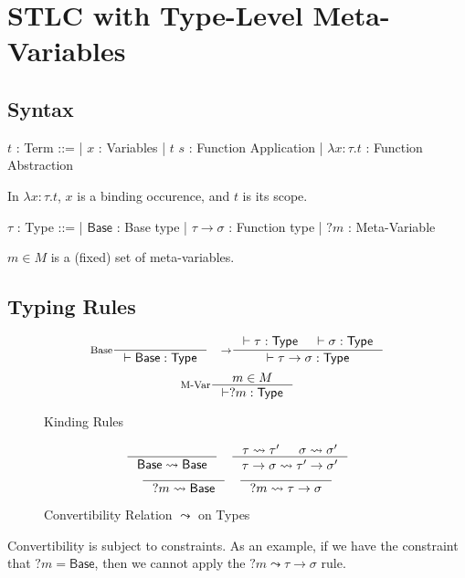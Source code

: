 \documentclass[a4paper]{report}
\newcommand{\Base}[0]{\mathsf{Base}}
\newcommand{\Type}[0]{\mathsf{Type}}
\newcommand{\Conv}[2]{#1 \leadsto #2}
\begin{document}
\newpage
\section{STLC with Type-Level Meta-Variables}
\subsection{Syntax}
\begin{bnf}
$t$ : \textsf{Term} ::=
| $x$ : Variables
| $t$ $s$ : Function Application
| $\lambda x \colon \tau. t$ : Function Abstraction
\end{bnf}

\hfill\break
In $\lambda x \colon \tau. t$, $x$ is a binding occurence, and $t$ is its scope.

\noindent
\begin{bnf}
$\tau$ : \textsf{Type} ::=
| $\Base$ : Base type
| $\tau \to \sigma$ : Function type
| $?m$ : Meta-Variable
\end{bnf}

\hfill\break
$m \in M$ is a (fixed) set of meta-variables.

\subsection{Typing Rules}
\begin{figure*}[h]
   \[
    \inference[Base]{}
                    {\vdash \Base : \Type}
    \quad
    \inference[$\to$]{\vdash \tau : \Type & \vdash \sigma : \Type}
                     {\vdash \tau \to \sigma : \Type}
  \]
   \[
    \inference[M-Var]{m \in M}
                     {\vdash ?m : \Type}
  \]
  
  \caption*{Kinding Rules}
  \label{fig:base-stlc-mltr}
\end{figure*}

\begin{figure*}[h]
   \[
    \inference[]{}
                {\Conv{\Base}{\Base}}
    \quad
    \inference[]{\Conv{\tau}{\tau'} & \Conv{\sigma}{\sigma'}}
                {\Conv{\tau \to \sigma}{\tau' \to \sigma'}}
  \]
   \[
    \inference[]{}
                {\Conv{?m}{\Base}}
    \quad
    \inference[]{}
                {\Conv{?m}{\tau \to \sigma}}
  \]
  
  \caption*{Convertibility Relation $\Conv{}{}$ on Types}
  \label{fig:base-stlc-mltr}
\end{figure*}

Convertibility is subject to constraints. As an example, if we have the constraint that $?m = \Base$, then we cannot apply the $\Conv{?m}{\tau \to \sigma}$ rule.
\end{document}
